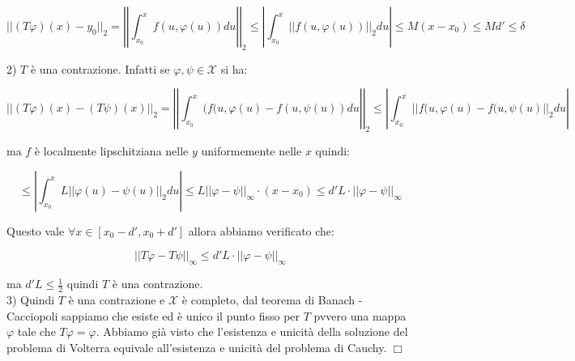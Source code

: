 \documentclass[a4paper,11pt,titlepage]{book}
\begin{document}
$$||(T\varphi)(x)-y_0||_2=\left|\left|\int_{x_0}^x f(u,\varphi(u))du\right|\right|_2\leq\left|\int_{x_0}^x ||f(u,\varphi(u))||_2 du\right|\leq M(x-x_0)\leq Md'\leq\delta$$

2) $T$ è una contrazione. Infatti se $\varphi,\psi\in\mathcal{X}$ si ha: 

$$||(T\varphi)(x)-(T\psi)(x)||_2=\left|\left|\int_{x_0}^x (f(u,\varphi(u)-f(u,\psi(u))du\right|\right|_2\leq\left|\int_{x_0}^x ||f(u,\varphi(u)-f(u,\psi(u)||_2 du\right|$$

ma $f$ è localmente lipschitziana nelle $y$ uniformemente nelle $x$ quindi:

$$\leq\left| \int_{x_0}^x L||\varphi(u)-\psi(u)||_2du\right|\leq L||\varphi-\psi||_\infty\cdot(x-x_0)\leq d'L\cdot||\varphi-\psi||_\infty$$

Questo vale $\forall x\in[x_0-d',x_0+d']$ allora abbiamo verificato che: 

$$||T\varphi-T\psi||_\infty\leq d'L\cdot||\varphi-\psi||_\infty$$

ma $d'L\leq\frac{1}{2}$ quindi $T$ è una contrazione.\\

3) Quindi $T$ è una contrazione e $\mathcal{X}$ è completo, dal teorema di Banach - Cacciopoli sappiamo che esiste ed è unico il punto fisso per $T$ pvvero una mappa $\varphi$ tale che $T\varphi=\varphi$. Abbiamo già visto che l'esistenza e unicità della soluzione del problema di Volterra equivale all'esistenza e unicità del problema di Cauchy. $\Box$
\end{document}
